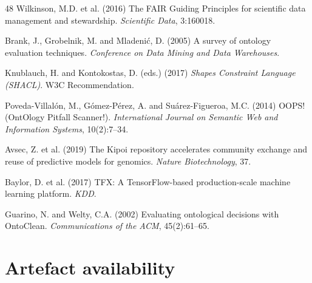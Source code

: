 \documentclass[11pt,a4paper]{article}
\begin{document}
\begin{thebibliography}{48}
 Wilkinson, M.D. et al. (2016) The FAIR Guiding Principles for scientific data management and stewardship. \emph{Scientific Data}, 3:160018.

 Brank, J., Grobelnik, M. and Mladeni\'c, D. (2005) A survey of ontology evaluation techniques. \emph{Conference on Data Mining and Data Warehouses}.

 Knublauch, H. and Kontokostas, D. (eds.) (2017) \emph{Shapes Constraint Language (SHACL)}. W3C Recommendation.

 Poveda-Villalón, M., Gómez-Pérez, A. and Suárez-Figueroa, M.C. (2014) OOPS! (OntOlogy Pitfall Scanner!). \emph{International Journal on Semantic Web and Information Systems}, 10(2):7--34.

 Avsec, Z. et al. (2019) The Kipoi repository accelerates community exchange and reuse of predictive models for genomics. \emph{Nature Biotechnology}, 37.

 Baylor, D. et al. (2017) TFX: A TensorFlow-based production-scale machine learning platform. \emph{KDD}.

 Guarino, N. and Welty, C.A. (2002) Evaluating ontological decisions with OntoClean. \emph{Communications of the ACM}, 45(2):61--65.

\end{thebibliography}

\appendix

\section{Artefact availability}\label{app:avail}
\end{document}
